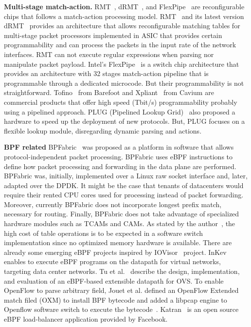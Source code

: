 \textbf{Multi-stage match-action.} RMT~\cite{bosshart2013forwarding}, dRMT~\cite{chole2017drmt}, and FlexPipe~\cite{FlexPipe2012} are reconfigurable chips that follows a match-action processing model.
RMT~\cite{bosshart2013forwarding} and its latest version dRMT~\cite{chole2017drmt} provides an architecture that allows reconfigurable matching tables for multi-stage packet processors implemented in ASIC that provides certain programmability and can process the packets in the input rate of the network interfaces. RMT can not execute regular expressions when parsing nor manipulate packet payload. Intel's FlexPipe~\cite{FlexPipe2012} is a switch chip architecture that provides an architecture with 32 stages match-action pipeline that is programmable through a dedicated microcode. But their programmability is not straightforward. Tofino~\cite{barefoot-tofino} from Barefoot and Xpliant~\cite{cavium1,cavium2} from Cavium are commercial products that offer high speed (Tbit/s) programmability probably using a pipelined approach.
PLUG (Pipelined Lookup Grid)~\cite{DeCarli:2009:PFL:1592568.1592593} also proposed a hardware to speed up the deployment of new protocols. But, PLUG focuses on a flexible lookup module, disregarding dynamic parsing and actions. 




\textbf{BPF related} BPFabric~\cite{Jouet:2017:BPFabric} was proposed as a platform in software that allows protocol-independent packet processing. 
BPFabric uses eBPF instructions to define how packet processing and forwarding in the data plane are performed.
BPFabric was, initially, implemented over a Linux raw socket interface and, later, adapted over the DPDK.
It might be the case that tenants of datacenters would require their rented CPU cores used for processing instead of packet forwarding. Moreover, currently BPFabric does not incorporate longest prefix match, necessary for routing. Finally, BPFabric does not take advantage of specialized  hardware modules such as TCAMs and CAMs.
As stated by the author~\cite{Jouet2017Thesis}, the high cost of table operations is to be expected in a software switch implementation
since no optimized memory hardware is available. 
There  are  already some emerging eBPF projects inspired by IOVisor~\cite{IOvisor} project.
InKev~\cite{InKeV2016} enables to execute eBPF programs on the datapath for virtual networks, targeting data center networks.
Tu et al.~\cite{Tu:2017:BEO:3139645.3139657} describe the design, implementation, and evaluation of an eBPF-based extensible datapath for OVS.
To enable OpenFlow to parse arbitrary field, Jouet et al. defined an OpenFlow Extended match filed (OXM) to install BPF bytecode and added a libpcap engine to Openflow software switch to execute the bytecode~\cite{Jouet2015OpenFlow}.
Katran~\cite{Katran2018} is an open source eBPF load-balancer application provided by Facebook.

